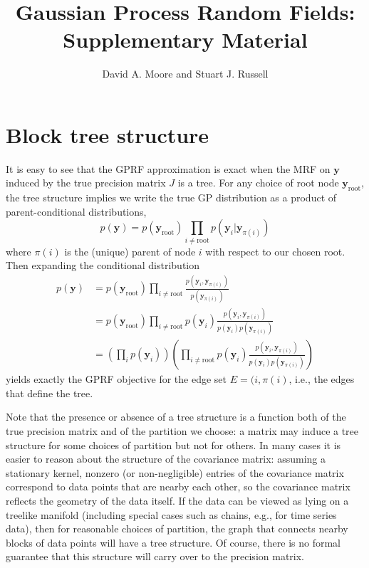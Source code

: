 \documentclass{article}
\renewcommand{\v}[1]{\mathbf{#1}}
\begin{document}
\title{Gaussian Process Random Fields: Supplementary Material}

\author{
David A. Moore and Stuart J. Russell\\
}

\maketitle



\section{Block tree structure}

It is easy to see that the GPRF approximation is exact when the MRF on $\v{y}$ induced by the true precision matrix $J$ is a tree. For any choice of root node $\v{y}_\text{root}$, the tree structure implies we write the true GP distribution as a product of parent-conditional distributions,
\[p(\v{y}) = p(\v{y}_\text{root}) \prod_{i \ne \text{root}} p(\v{y}_i | \v{y}_{\pi(i)})\]
where $\pi(i)$ is the (unique) parent of node $i$ with respect to our chosen root. Then expanding the conditional distribution
\begin{align*}
p(\v{y}) &= p(\v{y}_\text{root}) \prod_{i \ne \text{root}} \frac{p(\v{y}_i , \v{y}_{\pi(i)})}{p(\v{y}_{\pi(i)})}\\
 &= p(\v{y}_\text{root}) \prod_{i \ne \text{root}} p(\v{y}_i) \frac{p(\v{y}_i , \v{y}_{\pi(i)})}{p(\v{y}_i) p(\v{y}_{\pi(i)}) }\\
 &= \left(\prod_{i} p(\v{y}_i) \right) \left(\prod_{i \ne \text{root}} p(\v{y}_i) \frac{p(\v{y}_i , \v{y}_{\pi(i)})}{p(\v{y}_i) p(\v{y}_{\pi(i)}) }\right)
\end{align*}
yields exactly the GPRF objective for the edge set $E={(i, \pi(i)}$, i.e., the edges that define the tree. 

Note that the presence or absence of a tree structure is a function both of the true precision matrix and of the partition we choose: a matrix may induce a tree structure for some choices of partition but not for others. In many cases it is easier to reason about the structure of the covariance matrix: assuming a stationary kernel, nonzero (or non-negligible) entries of the covariance matrix correspond to data points that are nearby each other, so the covariance matrix reflects the geometry of the data itself. If the data can be viewed as lying on a treelike manifold (including special cases such as chains, e.g., for time series data), then for reasonable choices of partition, the graph that connects nearby blocks of data points will have a tree structure. Of course, there is no formal guarantee that this structure will carry over to the precision matrix.
\end{document}
